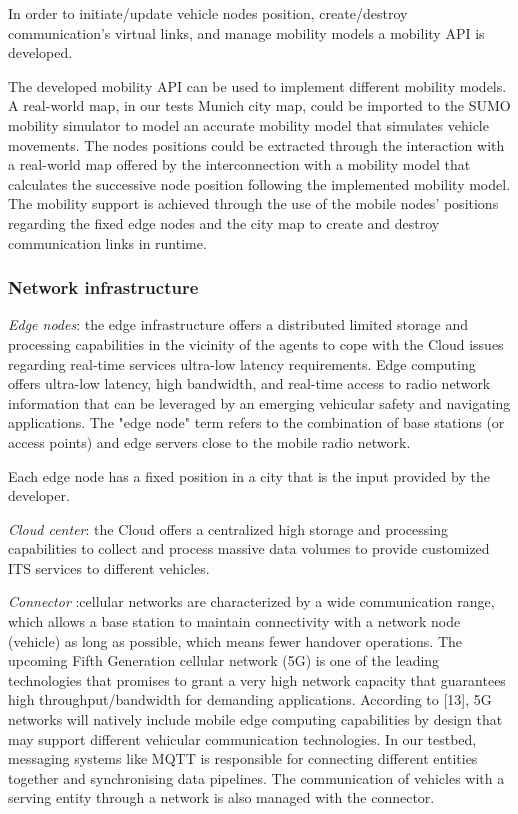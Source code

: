 \documentclass[conference]{IEEEtran}
\begin{document}
In order to initiate/update vehicle nodes position, create/destroy communication's virtual links, and manage mobility
models a mobility API is developed. 
\par The developed mobility API can be used to implement different mobility models. 
A real-world map, in our tests Munich city map, could be imported to the SUMO mobility simulator to model an accurate mobility model that simulates vehicle movements. 
The nodes positions could be extracted through the interaction with a real-world map offered by the interconnection with a mobility model that calculates the successive node position following the implemented mobility model. 
The mobility support is achieved through the use of the mobile nodes’ positions regarding the fixed edge nodes and the city map to create and destroy communication links in runtime.

\subsubsection{Network infrastructure}
\par\emph {Edge nodes}: the edge infrastructure offers a distributed limited storage and processing capabilities in the vicinity of the agents to cope with the Cloud issues regarding real-time services ultra-low latency requirements.
 Edge computing offers ultra-low latency, high bandwidth, and real-time access to radio network information that can be leveraged by an emerging vehicular safety and navigating applications. The "edge node" term refers to the combination of base stations (or access points) and edge servers close to the mobile radio network. 
 
 Each edge node has a fixed position in a city that is the input provided by the developer.

\par\emph {Cloud center}: the Cloud offers a centralized high storage and processing capabilities to collect and process massive data volumes to provide customized ITS services to different vehicles.
\par\emph {Connector} :cellular networks are characterized by a wide communication range, which allows a base station to maintain connectivity with a network node (vehicle) as long as possible, which means fewer handover operations. The upcoming Fifth Generation cellular network (5G) is one of the leading technologies that promises to grant a very high network capacity that guarantees high throughput/bandwidth for demanding applications. According to [13], 5G networks will natively include mobile edge computing capabilities by design that may support different vehicular communication
technologies. In our testbed, messaging systems like MQTT is responsible for connecting different entities together and synchronising data pipelines. The communication of vehicles with a serving entity through a network is also managed with the connector.
\end{document}
